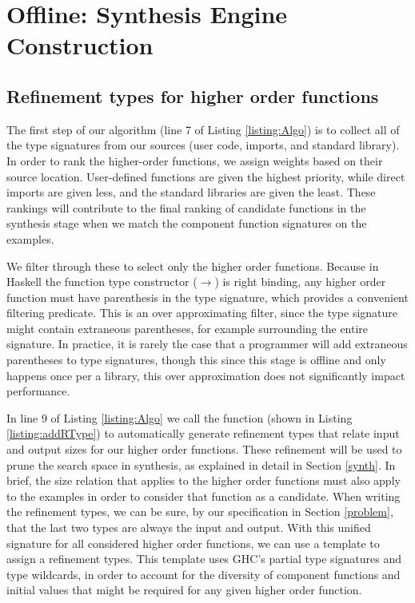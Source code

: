\section{Offline: Synthesis Engine Construction} \label{offline}



\subsection{Refinement types for higher order functions}\label{HORtypeInf}

The first step of our algorithm (line 7 of Listing \ref{listing:Algo}) is to collect all of the type signatures from our sources (user code, imports, and standard library).
In order to rank the higher-order functions, we assign weights based on their source location. User-defined functions are given the highest priority, while direct imports are given less, and the standard libraries are given the least. 
These rankings will contribute to the final ranking of candidate functions in the synthesis stage when we match the component function signatures on the examples.

We filter through these to select only the higher order functions. 
Because in Haskell the function type constructor ($\to$) is right binding, any higher order function must have parenthesis in the type signature, which provides a convenient filtering predicate. 
This is an over approximating filter, since the type signature might contain extraneous parentheses, for example surrounding the entire signature. 
In practice, it is rarely the case that a programmer will add extraneous parentheses to type signatures, though this since this stage is offline and only happens once per a library, this over approximation does not significantly impact performance.

In line 9 of Listing \ref{listing:Algo} we call the  function (shown in Listing \ref{listing:addRType}) to automatically generate refinement types that relate input and output sizes for our higher order functions.
These refinement will be used to prune the search space in synthesis, as explained in detail in Section \ref{synth}.
In brief, the size relation that applies to the higher order functions must also apply to the examples in order to consider that function as a candidate.
When writing the refinement types, we can be sure, by our specification in Section \ref{problem}, that the last two types are always the input and output.
With this unified signature for all considered higher order functions, we can use a template to assign a refinement types.
This template uses GHC's partial type signatures and type wildcards, in order to account for the diversity of component functions and initial values that might be required for any given higher order function.


